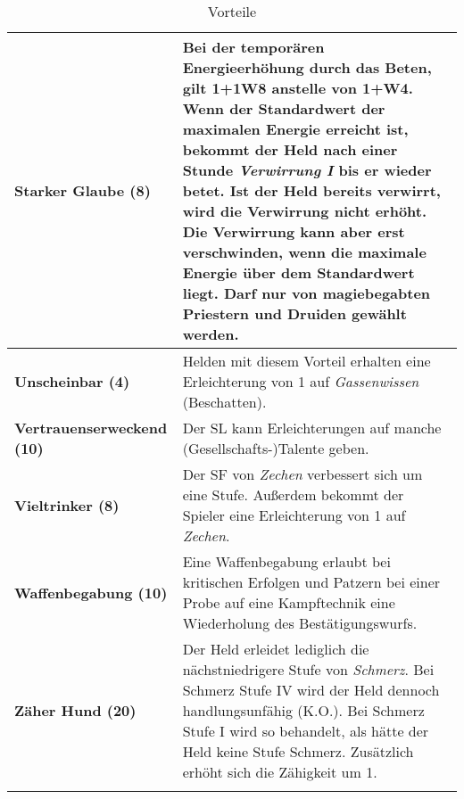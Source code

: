 \begin{longtable}{|p{5cm}|p{11cm}|}
\textbf{Starker Glaube (8)} & Bei der temporären Energieerhöhung durch das Beten, gilt 1+1W8 anstelle von 1+W4. Wenn der Standardwert der maximalen Energie erreicht ist, bekommt der Held nach einer Stunde \textit{Verwirrung I} bis er wieder betet. Ist der Held bereits verwirrt, wird die Verwirrung nicht erhöht. Die Verwirrung kann aber erst verschwinden, wenn die maximale Energie über dem Standardwert liegt. Darf nur von magiebegabten Priestern und Druiden gewählt werden. \\ \hline

\textbf{Unscheinbar (4)} & Helden mit diesem Vorteil erhalten eine Erleichterung von 1 auf \textit{Gassenwissen} (Beschatten). \\ \hline

\textbf{Vertrauenserweckend (10)} & Der SL kann Erleichterungen auf manche (Gesellschafts-)Talente geben. \\ \hline

\textbf{Vieltrinker (8)} & Der SF von \textit{Zechen} verbessert sich um eine Stufe. Außerdem bekommt der Spieler eine Erleichterung von 1 auf \textit{Zechen}. \\ \hline

\textbf{Waffenbegabung (10)} & Eine Waffenbegabung erlaubt bei kritischen Erfolgen und Patzern bei einer Probe auf eine Kampftechnik eine Wiederholung des Bestätigungswurfs. \\ \hline

\textbf{Zäher Hund (20)} & Der Held erleidet lediglich die nächstniedrigere Stufe von \textit{Schmerz}. Bei Schmerz Stufe IV wird der Held dennoch handlungsunfähig (K.O.). Bei Schmerz Stufe I wird so behandelt, als hätte der Held keine Stufe Schmerz. Zusätzlich erhöht sich die Zähigkeit um 1. \\ \hline

\caption{Vorteile}
\label{tab:Vorteile}
\end{longtable}

